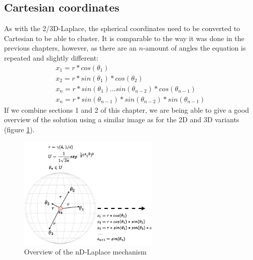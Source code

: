\subsection{Cartesian coordinates}
As with the 2/3D-Laplace, the spherical coordinates need to be converted to Cartesian to be able to cluster.
It is comparable to the way it was done in the previous chapters, however, as there are an $n$-amount of angles the equation is repeated and slightly different:
\begin{align*}
  x_1 = r * cos (\theta_1)                                          \\
  x_2 = r * sin (\theta_1) * cos (\theta_2)                         \\
  x_{n} = r * sin(\theta_1) … sin(\theta_{n-2}) *cos (\theta_{n-1}) \\
  x_n = r * sin(\theta_{n-1}) * sin(\theta_{n-2}) * sin(\theta_{n-1})
\end{align*}
If we combine sections 1 and 2 of this chapter, we are being able to give a good overview of the solution using a similar image as for the 2D and 3D variants (figure \ref{fig:nd-laplace-overview}).
\begin{figure}[ht]
  \includegraphics[width=0.6\textwidth]{TheorethicalFramework/ND-Laplace/Images/nd_laplace.png}
  \caption{Overview of the nD-Laplace mechanism}
  \label{fig:nd-laplace-overview}
\end{figure}
\newpage
